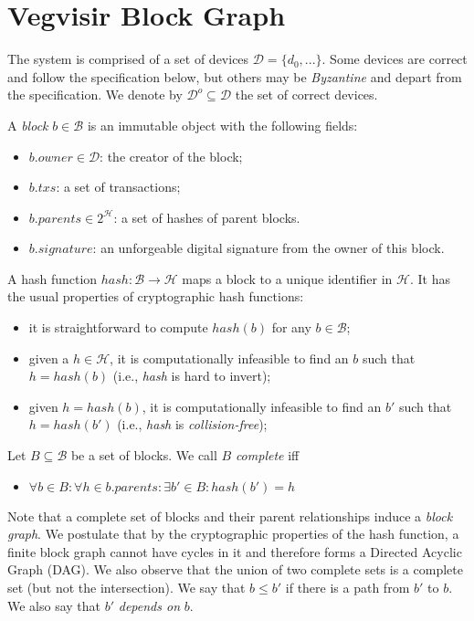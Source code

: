 \documentclass{article}
\begin{document}
\section{Vegvisir Block Graph}

The system is comprised of a set of devices $\mathcal{D} = \{ d_0, ... \}$.
Some devices are correct and follow the specification below,
but others may be \emph{Byzantine} and depart from the specification.  We denote by
$\mathcal{D}^o \subseteq \mathcal{D}$ the set of correct devices.

A \emph{block} $b \in \mathcal{B}$ is an immutable object with the following fields:
\begin{itemize}
\item $b.\mathit{owner} \in \mathcal{D}$: the creator of the block;
\item $b.\mathit{txs}$: a set of transactions;
\item $b.\mathit{parents} \in 2^\mathcal{H}$: a set of hashes of parent blocks.
\item $b.\mathit{signature}$: an unforgeable digital signature from the owner of this block.
\end{itemize}

A hash function $\mathit{hash}: \mathcal{B} \rightarrow \mathcal{H}$ maps a block to a unique
identifier in $\mathcal{H}$.  It has the usual properties of cryptographic hash functions:
\begin{itemize}
\item it is straightforward to compute $\mathit{hash}(b)$ for any $b \in \mathcal{B}$;
\item given a $h \in \mathcal{H}$, it is computationally infeasible to find an $b$ such that $h = \mathit{hash}(b)$ (i.e., \textit{hash} is hard to invert);
\item given $h = \mathit{hash}(b)$, it is computationally infeasible to find an $b'$ such that $h = \mathit{hash}(b')$ (i.e., \textit{hash} is \emph{collision-free});
\end{itemize}

Let $B \subseteq \mathcal{B}$ be a set of blocks.  We call $B$ \emph{complete} iff
\begin{itemize}
\item $\forall b \in B: \forall h \in b.\mathit{parents}: \exists b' \in B: \mathit{hash}(b') = h$
\end{itemize}

Note that a complete set of blocks and their parent relationships induce a \emph{block graph}.
We postulate that by the cryptographic properties of the hash function,
a finite block graph cannot have cycles in it and therefore forms a Directed Acyclic Graph (DAG).
We also observe that the union of two complete sets is a complete set (but not the intersection).
We say that $b \leq b'$ if there is a path from $b'$ to $b$.
We also say that $b'$ \emph{depends on} $b$.
\end{document}
